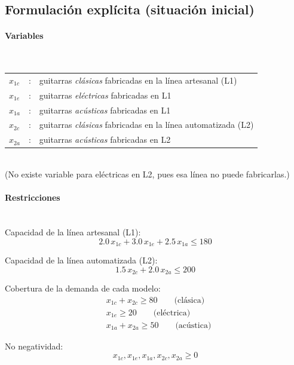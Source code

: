 \subsection{Formulación explícita (situación inicial)}

\paragraph{Variables}\mbox{}\\
\begin{tabular}{l c l}
    $x_{1c}$  & : & guitarras \textit{clásicas} fabricadas en la línea artesanal (L1)\\
    $x_{1e}$  & : & guitarras \textit{eléctricas} fabricadas en L1\\
    $x_{1a}$  & : & guitarras \textit{acústicas} fabricadas en L1\\
    $x_{2c}$  & : & guitarras \textit{clásicas} fabricadas en la línea automatizada (L2)\\
    $x_{2a}$  & : & guitarras \textit{acústicas} fabricadas en L2\\
\end{tabular}
\\[2pt]
(No existe variable para eléctricas en L2, pues esa línea no puede fabricarlas.)

\paragraph{Restricciones}\mbox{}\\
Capacidad de la línea artesanal (L1):
\begin{equation}
    2.0\,x_{1c} + 3.0\,x_{1e} + 2.5\,x_{1a} \leq 180
\end{equation}

Capacidad de la línea automatizada (L2):
\begin{equation}
    1.5\,x_{2c} + 2.0\,x_{2a} \leq 200
\end{equation}

Cobertura de la demanda de cada modelo:
\begin{align}
    & x_{1c} + x_{2c} \geq 80 \qquad \text{(clásica)}\\
    & x_{1e} \geq 20 \qquad \text{(eléctrica)}\\
    & x_{1a} + x_{2a} \geq 50 \qquad \text{(acústica)}
\end{align}

No negatividad:
\begin{equation}
    x_{1c}, x_{1e}, x_{1a}, x_{2c}, x_{2a} \geq 0
\end{equation}

